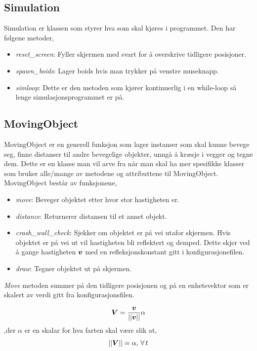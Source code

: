 {\subsection{Simulation}

Simulation er klassen som styrer hva som skal kjøres i programmet. Den har følgene metoder,\\

\begin{itemize}
    \item \emph{reset\_screen}: Fyller skjermen med svart for å overskrive tidligere posisjoner.
    \item \emph{spawn\_boids}: Lager boids hvis man trykker på venstre museknapp.
    \item \emph{simloop}: Dette er den metoden som kjører kontinuerlig i en while-loop så lenge simulasjonsprogrammet er på.
\end{itemize}

\subsection{MovingObject}

MovingObject er en generell funksjon som lager instanser som skal kunne bevege seg, finne distanser til andre bevegelige objekter, unngå å kræsje i vegger og tegne dem.
Dette er en klasse man vil arve fra når man skal ha mer spesifikke klasser som bruker alle/mange av metodene og attributtene til MovingObject.
MovingObject består av funksjonene,

\begin{itemize}
    \item \emph{move}: Beveger objektet etter hvor stor hastigheten er.
    \item \emph{distance}: Returnerer distansen til et annet objekt.
    \item \emph{crash\_wall\_check}: Sjekker om objektet er på vei utafor skjermen. Hvis objektet er på vei ut vil hastigheten bli reflektert og demped. Dette skjer ved å gange hastigheten $\boldsymbol{v}$ med en refleksjonskonstant gitt i konfigurasjonefilen.
    \item \emph{draw}: Tegner objektet ut på skjermen.
\end{itemize}

\emph{Move} metoden summer på den tidligere posisjonen og på en enhetsvektor som er skalert av verdi gitt fra konfigurasjonsfilen.

\begin{equation}
    \boldsymbol{V} = \frac{\boldsymbol{v}}{||\boldsymbol{v}||}\alpha
\end{equation}
,der $\alpha$ er en skalar for hva farten skal være slik at,
\begin{equation}
     ||\boldsymbol{V}|| = \alpha, \, \forall\,t
\end{equation}

}
